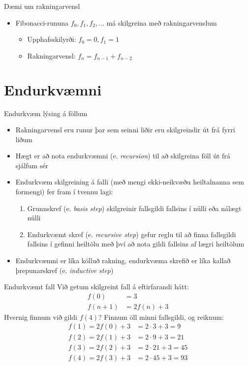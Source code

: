 \documentclass[handout]{beamer}
\begin{document}
\begin{frame}{Dæmi um rakningarvensl}
\begin{itemize}
 \item Fibonacci-rununa $f_0, f_1, f_2, \ldots$ má skilgreina með rakningarvenslum
 \begin{itemize}
  \item Upphafsskilyrði: $f_0 = 0, f_1 = 1$
  \item Rakningarvensl: $f_n = f_{n-1} + f_{n-2}$
 \end{itemize}
\end{itemize}
\end{frame}

\section{Endurkvæmni}

\begin{frame}{Endurkvæm lýsing á föllum}
\begin{itemize}
 \item Rakningarvensl eru runur þar sem seinni liðir eru skilgreindir út frá fyrri liðum
 \item Hægt er að nota endurkvæmni (e. \emph{recursion}) til að skilgreina föll út frá sjálfum sér
 \item Endurkvæm skilgreining á falli (með mengi ekki-neikvæðu heiltalnanna sem formengi) fer fram í tvennu lagi:
 \begin{enumerate}
  \item Grunnskref (e. \emph{basis step}) skilgreinir fallsgildi fallsins í núlli eða nálægt núlli
  \item Endurkvæmt skref (e. \emph{recursive step}) gefur reglu til að finna fallsgildi fallsins í gefinni heiltölu með því að nota gildi fallsins af lægri heiltölum
 \end{enumerate}
 \item Endurkvæmni er líka kölluð rakning, endurkvæma skrefið er líka kallað þrepunarskref (e. \emph{inductive step})
\end{itemize}
\end{frame}

\begin{frame}{Endurkvæmt fall}
Við getum skilgreint fall á eftirfarandi hátt:
\begin{align*}
f(0) &= 3\\
f(n+1) &= 2f(n) + 3
\end{align*}
Hvernig finnum við gildi $f(4)$? \pause Finnum öll minni fallsgildi, og reiknum:
\begin{align*}
f(1) = 2f(0) + 3 &= 2 \cdot 3 + 3 = 9\\
f(2) = 2f(1) + 3 &= 2 \cdot 9 + 3 = 21\\
f(3) = 2f(2) + 3 &= 2 \cdot 21 + 3 = 45\\
f(4) = 2f(3) + 3 &= 2 \cdot 45 + 3 = 93
\end{align*}
\end{frame}
\end{document}
